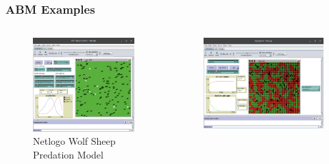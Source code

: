 \documentclass[compress]{beamer}
\begin{document}
    \begin{frame}[Blank] \frametitle{ABM Examples}
        \begin{columns}
            \begin{column}{0.5\textwidth}
                \begin{figure}
                    \centering
                    \includegraphics[width=1.0\linewidth]{../figures/netlogo_wolf_sheep_predation}
                    \caption{Netlogo Wolf Sheep Predation Model}
                    \label{fig:netlogowolfsheeppredation}
                \end{figure}
            \end{column}
            \begin{column}{0.5\textwidth}
                \begin{figure}
                    \centering
                    \includegraphics[width=1.0\linewidth]{../figures/netlogo_segregation}

\end{figure}
\end{column}
\end{columns}
\end{frame}
\end{document}
